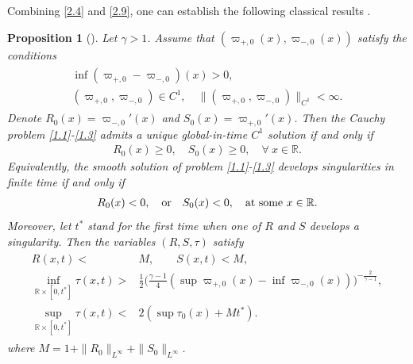\documentclass[11pt,reqno]{article}
\newtheorem{prop}{Proposition}
\newcommand{\fr}{\frac}
\numberwithin{equation}{section}
\begin{document}
Combining \eqref{2.4} and \eqref{2.9}, one can establish the following classical results \cite{Chen3, Chen4}.
\begin{prop}[\cite{Chen3, Chen4}] \label{prop-c}
Let $\gamma>1$. Assume that $(\varpi_{+,0}(x), \varpi_{-,0}(x))$ satisfy the conditions
\begin{align}\label{2.11}
\begin{split}
\inf(\varpi_{+,0}-\varpi_{-,0})(x)>0, \\
(\varpi_{+,0}, \varpi_{-,0})\in C^1,\quad \|(\varpi_{+,0}, \varpi_{-,0})\|_{C^1}<\infty.
\end{split}
\end{align}
Denote $R_0(x)=\varpi_{-,0}'(x)$ and $S_0(x)=\varpi_{+,0}'(x)$. Then the Cauchy problem \eqref{1.1}-\eqref{1.3} admits a unique global-in-time $C^1$ solution if and only if
\begin{align}\label{2.12}
R_0(x)\geq0,\quad S_0(x)\geq0, \quad \forall\ x\in \mathbb{R}.
\end{align}
Equivalently, the smooth solution of problem \eqref{1.1}-\eqref{1.3} develops singularities in finite time if and only if
\begin{align}\label{2.13}
R_0(x)<0,\quad {\rm or}\quad S_0(x)<0, \quad {\rm at\ some}\ x\in \mathbb{R}.
\end{align}
Moreover, let $t^*$ stand for the first time when one of $R$ and $S$ develops a singularity. Then the variables $(R, S, \tau)$ satisfy
\begin{align}\label{2.14}
\begin{split}
R(x,t)<&M,\qquad S(x,t)<M, \\
\inf_{\mathbb{R}\times[0,t^*]}\tau(x,t)>&\fr{1}{2}\Big(\fr{\gamma-1}{4}(\sup \varpi_{+,0}(x)-\inf \varpi_{-,0}(x))\Big)^{-\fr{2}{\gamma-1}},\\
\sup_{\mathbb{R}\times[0,t^*]}\tau(x,t)<&2(\sup \tau_0(x) +Mt^*).
\end{split}
\end{align}
where $M=1+\|R_0\|_{L^\infty} +\|S_0\|_{L^\infty}$.
\end{prop}
\end{document}
